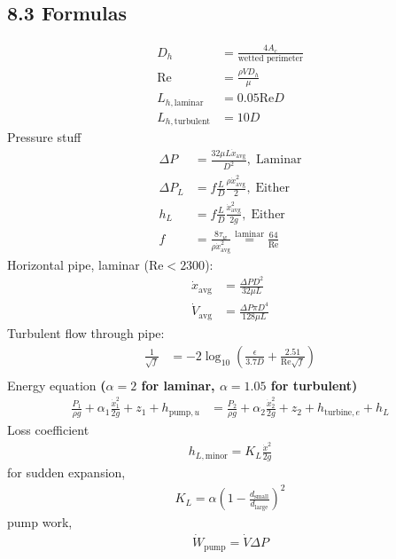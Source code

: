\subsection*{8.3 Formulas}
\begin{align*}
    D_h &= \frac{4A_c}{\text{wetted perimeter}} \\
    \text{Re} &= \frac{\rho V D_h}{\mu} \\
    L_{h, \text{laminar}} &= 0.05 \text{Re} D \\
    L_{h, \text{turbulent}} &= 10D
\end{align*}
Pressure stuff
\begin{align*}
    \Delta P &= \frac{32 \mu L \dot{x}_{\text{avg}}}{D^2}, \; \text{Laminar} \\
    \Delta P_L &= f \frac{L}{D} \frac{\rho \dot{x}_{\text{avg}}^2}{2}, \; \text{Either} \\
    h_L &= f \frac{L}{D} \frac{\dot{x}_{\text{avg}}^2}{2g}, \; \text{Either} \\
    f &= \frac{8\tau_w}{\rho \dot{x}_{\text{avg}}^2} \overset{\text{laminar}}{=} \frac{64}{\text{Re}}
\end{align*}
Horizontal pipe, laminar (Re$<2300$):
\begin{align*}
    \dot{x}_{\text{avg}} &= \frac{\Delta P D^2}{32 \mu L} \\
    \dot{V}_{\text{avg}} &= \frac{\Delta P \pi D^4}{128 \mu L} 
\end{align*}
Turbulent flow through pipe:
\begin{align*}
    \frac{1}{\sqrt{f}} &= -2 \log_{10} \left(\frac{\epsilon}{3.7D} + \frac{2.51}{\text{Re} \sqrt{f}}\right) \\
\end{align*}    
Energy equation \textbf{($\alpha = 2$ for laminar, $\alpha = 1.05$ for turbulent)}
\begin{align*}
    \frac{P_1}{\rho g} + \alpha_1 \frac{\dot{x}_1^2}{2g} + z_1 + h_{\text{pump}, u} &= \frac{P_2}{\rho g} + \alpha_2 \frac{\dot{x}_2^2}{2g} + z_2 + h_{\text{turbine}, e} + h_L
\end{align*}
Loss coefficient
\begin{align*}
    h_{L, \text{minor}} = K_L \frac{\dot{x}^2}{2g}
\end{align*}
for sudden expansion,
\begin{align*}
    K_L = \alpha \left(1 - \frac{d_{\text{small}}}{d_{\text{large}}}\right)^2
\end{align*}
pump work,
\begin{align*}
    \dot{W}_{\text{pump}} = \dot{V} \Delta P
\end{align*}
